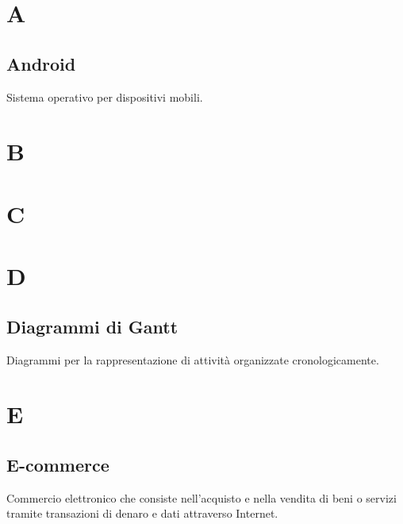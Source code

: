 \newpage \section{A}
\subsection{Android} Sistema operativo per dispositivi mobili.

\newpage \section{B}
\newpage \section{C}
\newpage \section{D}
\subsection{Diagrammi di Gantt} Diagrammi per la rappresentazione di attività organizzate cronologicamente.
\newpage \section{E}
\subsection{E-commerce} Commercio elettronico che consiste nell'acquisto e nella vendita di beni o servizi tramite transazioni di denaro e dati attraverso Internet.

